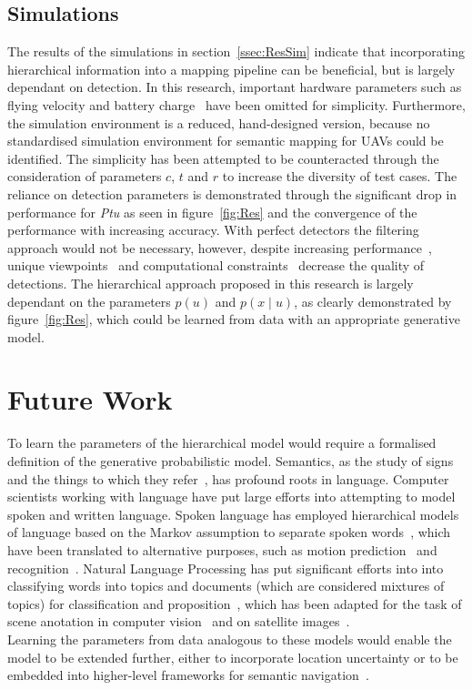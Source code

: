 \documentclass[twocolumn,letterpaper]{IEEEAerospaceCLS}  %
\begin{document}
\subsection{Simulations} \label{ssec:DiscSim}
The results of the simulations in section~\ref{ssec:ResSim} indicate that incorporating hierarchical information into a mapping pipeline can be beneficial, but is largely dependant on detection. In this research, important hardware parameters such as flying velocity and battery charge~\cite{boroujerdian_mavbench_2018} have been omitted for simplicity. Furthermore, the simulation environment is a reduced, hand-designed version, because no standardised simulation environment for semantic mapping for UAVs could be identified. The simplicity has been attempted to be counteracted through the consideration of parameters $c$, $t$ and $r$ to increase the diversity of test cases.   
The reliance on detection parameters is demonstrated through the significant drop in performance for \emph{Ptu} as seen in figure~\ref{fig:Res} and the convergence of the performance with increasing accuracy. With perfect detectors the filtering approach would not be necessary, however, despite increasing performance~\cite{alom_history_2018}, unique viewpoints~\cite{richardwebster_psyphy:_2019} and computational constraints~\cite{krishnan_sky_2020} decrease the quality of detections. The hierarchical approach proposed in this research is largely dependant on the parameters $p(u)$ and $p(x\mid u)$, as clearly demonstrated by figure~\ref{fig:Res}, which could be learned from data with an appropriate generative model.
\section{Future Work} \label{sec:Fut}
To learn the parameters of the hierarchical model would require a formalised definition of the generative probabilistic model. Semantics, as the study of signs and the things to which they refer~\cite{kostavelis_semantic_2015}, has profound roots in language. Computer scientists working with language have put large efforts into attempting to model spoken and written language. Spoken language has employed hierarchical models of language based on the Markov assumption to separate spoken words~\cite{fine_hierarchical_1998,murphy_dynamic_2002}, which have been translated to alternative purposes, such as motion prediction~\cite{li_layered_2015} and recognition~\cite{oliver_layered_2002,aarno_layered_2006}. Natural Language Processing has put significant efforts into into classifying words into topics and documents (which are considered mixtures of topics) for classification and proposition~\cite{blei_latent_2003,hofmann_unsupervised_2001}, which has been adapted for the task of scene anotation in computer vision~\cite{bosch_scene_2006,fei-fei_bayesian_2005} and on satellite images~\cite{lienou_semantic_2010}.\\
Learning the parameters from data analogous to these models would enable the model to be extended further, either to incorporate location uncertainty or to be embedded into higher-level frameworks for semantic navigation~\cite{mandel_towards_2020,vanegas_uncertainty_2016}.\\
\end{document}
